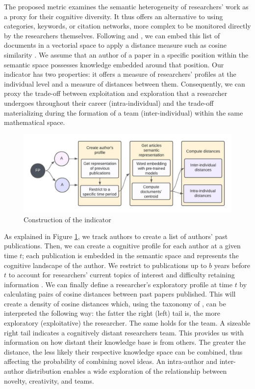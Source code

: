     
        The proposed metric examines the semantic heterogeneity of researchers' work as a proxy for their cognitive diversity. It thus offers an alternative to using categories, keywords, or citation networks, more complex to be monitored directly by the researchers themselves. Following \cite{hain2020text} and \citep{shibayama2021measuring}, we can embed this list of documents in a vectorial space to apply a distance measure such as cosine similarity \citep{mikolov2013distributed}. We assume that an author of a paper in a specific position within the semantic space possesses knowledge embedded around that position. Our indicator has two properties: it offers a measure of researchers' profiles at the individual level and a measure of distances between them. Consequently, we can proxy the trade-off between exploitation and exploration that a researcher undergoes throughout their career (intra-individual) and the trade-off materializing during the formation of a team (inter-individual) within the same mathematical space. 
    \begin{figure}[H]
      \centering
      \includegraphics[width=\textwidth]{2_chapter2/figures/indicator_roadmap.jpeg}
      \caption{Construction of the indicator}
      \label{figure:mapidic}
    \end{figure}

    
    As explained in Figure \ref{figure:mapidic}, we track authors to create a list of authors' past publications. Then, we can create a cognitive profile for each author at a given time $t$; each publication is embedded in the semantic space and represents the cognitive landscape of the author. We restrict to publications up to $b$ years before $t$ to account for researchers' current topics of interest and difficulty retaining information \citep{argote1990persistence}. We can finally define a researcher's exploratory profile at time $t$ by calculating pairs of cosine distances between past papers published. This will create a density of cosine distances which, using the taxonomy of \cite{march1991exploration}, can be interpreted the following way: the fatter the right (left) tail is, the more exploratory (exploitative) the researcher. The same holds for the team. A sizeable right tail indicates a cognitively distant researchers team. This provides us with information on how distant their knowledge base is from others. The greater the distance, the less likely their respective knowledge space can be combined, thus affecting the probability of combining novel ideas. An intra-author and inter-author distribution enables a wide exploration of the relationship between novelty, creativity, and teams.

